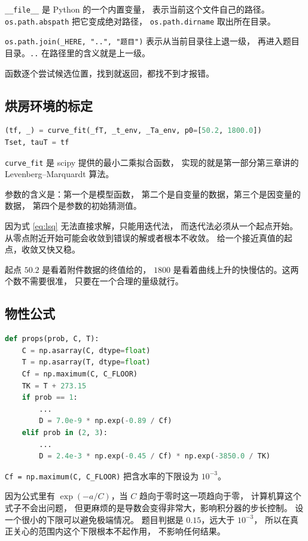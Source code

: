 \texttt{\_\_file\_\_} 是 Python 的一个内置变量，
表示当前这个文件自己的路径。\texttt{os.path.abspath} 把它变成绝对路径，
\texttt{os.path.dirname} 取出所在目录。

\texttt{os.path.join(\_HERE, "..", "题目")} 表示从当前目录往上退一级，
再进入题目目录。\texttt{..} 在路径里的含义就是上一级。

函数逐个尝试候选位置，找到就返回，都找不到才报错。

\subsection{烘房环境的标定}

\begin{lstlisting}[language=Python]
(tf, _) = curve_fit(_fT, _t_env, _Ta_env, p0=[50.2, 1800.0])
Tset, tauT = tf
\end{lstlisting}

\texttt{curve\_fit} 是 scipy 提供的最小二乘拟合函数，
实现的就是第一部分第三章讲的 Levenberg--Marquardt 算法。

参数的含义是：第一个是模型函数，
第二个是自变量的数据，第三个是因变量的数据，
第四个是参数的初始猜测值。

因为式 \eqref{eq:lsq} 无法直接求解，只能用迭代法，
而迭代法必须从一个起点开始。
从零点附近开始可能会收敛到错误的解或者根本不收敛。
给一个接近真值的起点，收敛又快又稳。

起点 $50.2$ 是看着附件数据的终值给的，
$1800$ 是看着曲线上升的快慢估的。这两个数不需要很准，
只要在一个合理的量级就行。

\subsection{物性公式}

\begin{lstlisting}[language=Python]
def props(prob, C, T):
    C = np.asarray(C, dtype=float)
    T = np.asarray(T, dtype=float)
    Cf = np.maximum(C, C_FLOOR)
    TK = T + 273.15
    if prob == 1:
        ...
        D = 7.0e-9 * np.exp(-0.89 / Cf)
    elif prob in (2, 3):
        ...
        D = 2.4e-3 * np.exp(-0.45 / Cf) * np.exp(-3850.0 / TK)
\end{lstlisting}

\texttt{Cf = np.maximum(C, C\_FLOOR)} 把含水率的下限设为 $10^{-3}$。

因为公式里有 $\exp(-a/C)$，当 $C$ 趋向于零时这一项趋向于零，
计算机算这个式子不会出问题，
但更麻烦的是导数会变得非常大，影响积分器的步长控制。
设一个很小的下限可以避免极端情况。
题目判据是 $0.15$，远大于 $10^{-3}$，
所以在真正关心的范围内这个下限根本不起作用，
不影响任何结果。

